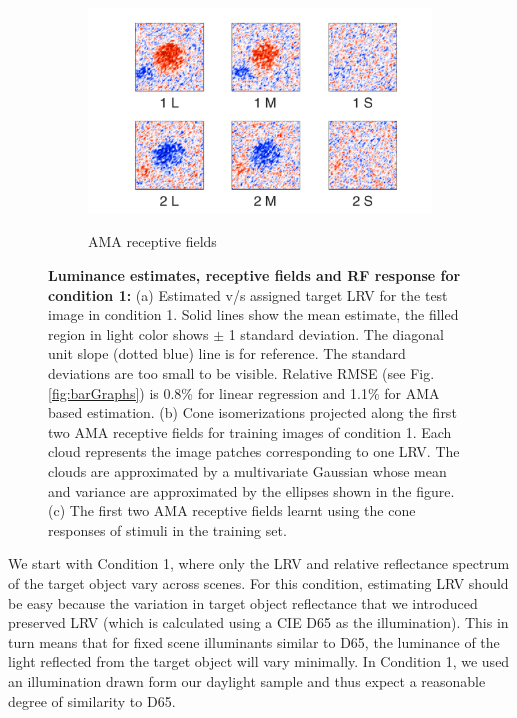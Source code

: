 \documentclass{jov}
\begin{document}
\begin{figure}
\begin{subfigure}[b]{0.26 \textwidth}
        \label{fig:case1RFResponse}
    \end{subfigure}
    ~
    \begin{subfigure}[b]{0.28 \textwidth}
	\caption{AMA receptive fields}
	\includegraphics[width=1.07\textwidth, trim={0 -0.6cm 0 -0.3cm}]{../FiguresDraft4/Figure10/Figure10_c.pdf}
	\label{fig:case1RFs}
    \end{subfigure}   
    \caption{{\bf Luminance estimates, receptive fields and RF response for condition 1:} (a) Estimated v/s assigned target LRV for the test image in condition 1. Solid lines show the mean estimate, the filled region in light color shows $\pm$ 1 standard deviation. The diagonal unit slope (dotted blue) line is for reference. The standard deviations are too small to be visible. Relative RMSE (see Fig.\ref{fig:barGraphs}) is 0.8\% for linear regression and 1.1\%  for AMA based estimation. (b) Cone isomerizations projected along the first two AMA receptive fields for training images of condition 1. Each cloud represents the image patches corresponding to one LRV. The clouds are approximated by a multivariate Gaussian whose mean and variance are approximated by the ellipses shown in the figure. (c) The first two AMA receptive fields learnt using the cone responses of stimuli in the training set.}
\label{fig:Condition1}
\end{figure}

We start with Condition 1, where only the LRV and relative reflectance spectrum of the target object vary across scenes.
For this condition, estimating LRV should be easy because the variation in target object reflectance that we introduced
preserved LRV (which is calculated using a CIE D65 as the illumination).
This in turn means that for fixed scene illuminants similar to D65, the luminance of the light reflected from the target object will vary minimally.
In Condition 1, we used an illumination drawn form our daylight sample and thus expect a reasonable degree of similarity to D65.
\end{document}

